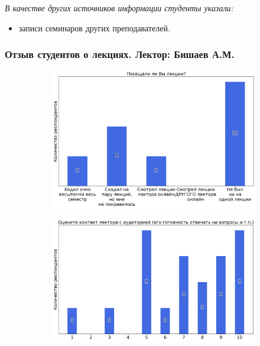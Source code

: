 		\textit{В качестве других источников информации студенты указали:} 
		\begin{itemize}
            \item записи семинаров других преподавателей.
		\end{itemize}

	\subsubsection{Отзыв студентов о лекциях. Лектор: Бишаев А.М.}

		\begin{figure}[H]
			\centering
            \begin{subfigure}[b]{0.45\textwidth}
				\centering
				\includegraphics[width=\textwidth]{images/2 course/Дифференциальные уравнения/lecturer-questions-Бишаев А.М.-0.png}
			\end{subfigure}
			\begin{subfigure}[b]{0.45\textwidth}
				\centering
				\includegraphics[width=\textwidth]{images/2 course/Дифференциальные уравнения/lecturer-marks-Бишаев А.М.-0.png}

\end{subfigure}
\end{figure}

